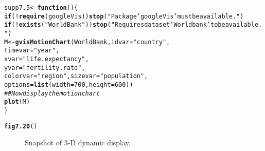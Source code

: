 \documentclass[12pt, a4paper,  BCOR=8.25mm, DIV=15]{scrartcl}\usepackage[]{graphicx}\usepackage[]{color}
\makeatletter
\newcommand{\hlnum}[1]{\textcolor[rgb]{0.686,0.059,0.569}{#1}}%
\newcommand{\hlstr}[1]{\textcolor[rgb]{0.192,0.494,0.8}{#1}}%
\newcommand{\hlcom}[1]{\textcolor[rgb]{0.678,0.584,0.686}{\textit{#1}}}%
\newcommand{\hlopt}[1]{\textcolor[rgb]{0,0,0}{#1}}%
\newcommand{\hlstd}[1]{\textcolor[rgb]{0.345,0.345,0.345}{#1}}%
\newcommand{\hlkwa}[1]{\textcolor[rgb]{0.161,0.373,0.58}{\textbf{#1}}}%
\newcommand{\hlkwb}[1]{\textcolor[rgb]{0.69,0.353,0.396}{#1}}%
\newcommand{\hlkwc}[1]{\textcolor[rgb]{0.333,0.667,0.333}{#1}}%
\newcommand{\hlkwd}[1]{\textcolor[rgb]{0.737,0.353,0.396}{\textbf{#1}}}%
\newenvironment{kframe}{%
 \def\at@end@of@kframe{}%
 \ifinner\ifhmode%
  \def\at@end@of@kframe{\end{minipage}}%
  \begin{minipage}{\columnwidth}%
 \fi\fi%
 \def\FrameCommand##1{\hskip\@totalleftmargin \hskip-\fboxsep
 \colorbox{shadecolor}{##1}\hskip-\fboxsep
     \hskip-\linewidth \hskip-\@totalleftmargin \hskip\columnwidth}%
 \MakeFramed {\advance\hsize-\width
   \@totalleftmargin\z@ \linewidth\hsize
   \@setminipage}}%
 {\par\unskip\endMakeFramed%
 \at@end@of@kframe}
\newenvironment{knitrout}{}{} %
\makeatother
\begin{document}
\begin{knitrout}
\color{fgcolor}\begin{kframe}
\begin{alltt}
\hlstd{supp7.5} \hlkwb{<-} \hlkwa{function}\hlstd{()\{}
\hlkwa{if}\hlstd{(}\hlopt{!}\hlkwd{require}\hlstd{(googleVis))}\hlkwd{stop}\hlstd{(}\hlstr{"Package 'googleVis' must be available."}\hlstd{)}
\hlkwa{if}\hlstd{(}\hlopt{!}\hlkwd{exists}\hlstd{(}\hlstr{"WorldBank"}\hlstd{))}\hlkwd{stop}\hlstd{(}\hlstr{"Requires dataset 'Worldbank' to be available."}\hlstd{)}
\hlstd{M} \hlkwb{<-} \hlkwd{gvisMotionChart}\hlstd{(WorldBank,} \hlkwc{idvar}\hlstd{=}\hlstr{"country"}\hlstd{,}
          \hlkwc{timevar}\hlstd{=}\hlstr{"year"}\hlstd{,}
          \hlkwc{xvar}\hlstd{=}\hlstr{"life.expectancy"}\hlstd{,}
          \hlkwc{yvar}\hlstd{=}\hlstr{"fertility.rate"}\hlstd{,}
          \hlkwc{colorvar}\hlstd{=}\hlstr{"region"}\hlstd{,} \hlkwc{sizevar}\hlstd{=}\hlstr{"population"}\hlstd{,}
          \hlkwc{options}\hlstd{=}\hlkwd{list}\hlstd{(}\hlkwc{width}\hlstd{=}\hlnum{700}\hlstd{,} \hlkwc{height}\hlstd{=}\hlnum{600}\hlstd{))}
\hlcom{## Now display the motion chart}
\hlkwd{plot}\hlstd{(M)}
\hlstd{\}}
\end{alltt}
\end{kframe}
\end{knitrout}

\begin{knitrout}
\color{fgcolor}\begin{kframe}
\begin{alltt}
\hlkwd{fig7.20}\hlstd{()}
\end{alltt}
\end{kframe}
\end{knitrout}

\begin{figure}

\caption{Snapshot of 3-D dynamic display.}\label{fig:rgl-ex}
\end{figure}
\end{document}
